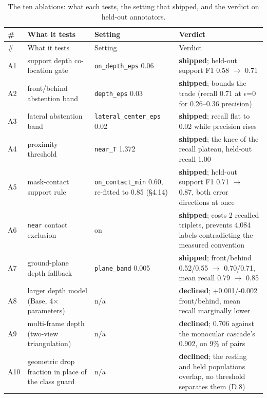 \begin{center}
\setlength{\tabcolsep}{3pt}
\footnotesize
\begin{longtable}{>{\raggedright\arraybackslash}p{}>{\raggedright\arraybackslash}p{}>{\raggedright\arraybackslash}p{}>{\raggedright\arraybackslash}p{}}
\caption[The ten ablations]{The ten ablations: what each tests, the setting that shipped, and the verdict on held-out annotators.}\\
\hline
\# & What it tests & Setting & Verdict \\
\hline
\endfirsthead
\hline
\# & What it tests & Setting & Verdict \\
\hline
\endhead
A1 & support depth co-location gate & \texttt{on\_\allowbreak{}depth\_\allowbreak{}eps} 0.06 & \textbf{shipped}; held-out support F1 0.58 $\rightarrow$ 0.71 \\
A2 & front/behind abstention band & \texttt{depth\_\allowbreak{}eps} 0.03 & \textbf{shipped}; bounds the trade (recall 0.71 at $\epsilon$=0 for 0.26--0.36 precision) \\
A3 & lateral abstention band & \texttt{lateral\_\allowbreak{}center\_\allowbreak{}eps} 0.02 & \textbf{shipped}; recall flat to 0.02 while precision rises \\
A4 & proximity threshold & \texttt{near\_\allowbreak{}T} 1.372 & \textbf{shipped}; the knee of the recall plateau, held-out recall 1.00 \\
A5 & mask-contact support rule & \texttt{on\_\allowbreak{}contact\_\allowbreak{}min} 0.60, re-fitted to 0.85 (\S{}4.14) & \textbf{shipped}; held-out support F1 0.71 $\rightarrow$ 0.87, both error directions at once \\
A6 & \texttt{near} contact exclusion & on & \textbf{shipped}; costs 2 recalled triplets, prevents 4,084 labels contradicting the measured convention \\
A7 & ground-plane depth fallback & \texttt{plane\_\allowbreak{}band} 0.005 & \textbf{shipped}; front/behind 0.52/0.55 $\rightarrow$ 0.70/0.71, mean recall 0.79 $\rightarrow$ 0.85 \\
A8 & larger depth model (Base, 4$\times$ parameters) & n/a & \textbf{declined}; +0.001/-0.002 front/behind, mean recall marginally lower \\
A9 & multi-frame depth (two-view triangulation) & n/a & \textbf{declined}; 0.706 against the monocular cascade's 0.902, on 9\% of pairs \\
A10 & geometric drop fraction in place of the class guard & n/a & \textbf{declined}; the resting and held populations overlap, no threshold separates them (D.8) \\
\hline
\end{longtable}
\end{center}

